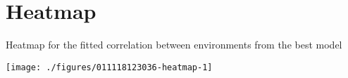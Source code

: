 \documentclass[a4paper,11pt]{article}\usepackage[]{graphicx}\usepackage[]{color}
\newenvironment{knitrout}{}{} %
\begin{document}
\clearpage
\section{Heatmap}
Heatmap for the fitted correlation between environments from the best model
\begin{knitrout}
\color{fgcolor}

\texttt{[image: ./figures/011118123036-heatmap-1]} \hfill{}



\end{knitrout}

\end{document}
